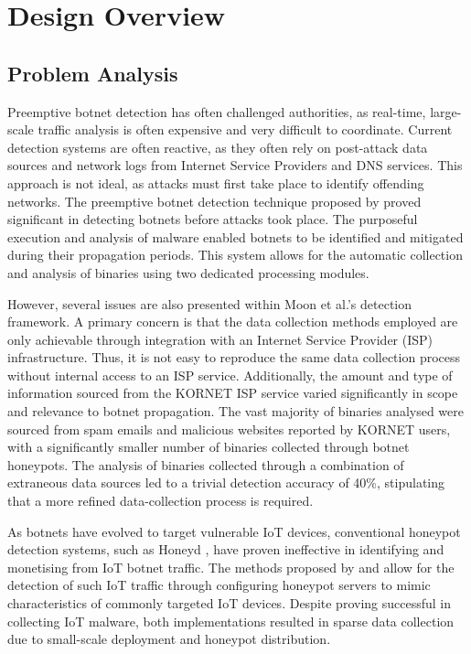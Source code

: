\chapter{Design Overview}

\section{Problem Analysis}

Preemptive botnet detection has often challenged authorities, as real-time, large-scale traffic analysis is often expensive and very difficult to coordinate. Current detection systems are often reactive, as they often rely on post-attack data sources and network logs from Internet Service Providers and DNS services. This approach is not ideal, as attacks must first take place to identify offending networks. The preemptive botnet detection technique proposed by \citet{Moon2012} proved significant in detecting botnets before attacks took place. The purposeful execution and analysis of malware enabled botnets to be identified and mitigated during their propagation periods. This system allows for the automatic collection and analysis of binaries using two dedicated processing modules. 

However, several issues are also presented within Moon et al.'s detection framework. A primary concern is that the data collection methods employed are only achievable through integration with an Internet Service Provider (ISP) infrastructure. Thus, it is not easy to reproduce the same data collection process without internal access to an ISP service. Additionally, the amount and type of information sourced from the KORNET ISP service varied significantly in scope and relevance to botnet propagation. The vast majority of binaries analysed were sourced from spam emails and malicious websites reported by KORNET users, with a significantly smaller number of binaries collected through botnet honeypots. The analysis of binaries collected through a combination of extraneous data sources led to a trivial detection accuracy of 40\%, stipulating that a more refined data-collection process is required.

As botnets have evolved to target vulnerable IoT devices, conventional honeypot detection systems, such as Honeyd \citep{Honeyd2008}, have proven ineffective in identifying and monetising from IoT botnet traffic. The methods proposed by \citep{PaPa2016} and \citep{Antonakakis2017} allow for the detection of such IoT traffic through configuring honeypot servers to mimic characteristics of commonly targeted IoT devices. Despite proving successful in collecting IoT malware, both implementations resulted in sparse data collection due to small-scale deployment and honeypot distribution. 


